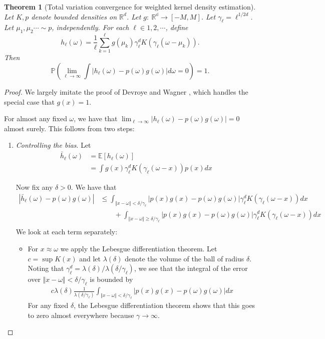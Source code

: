 \documentclass{article}
\newtheorem{theorem}{Theorem}
\theoremstyle{definition}
\begin{document}
\begin{theorem}[Total variation convergence for weighted kernel density estimation] \label{lem:kdereg}
Let $K,p$ denote bounded densities on $\mathbb{R}^d$.  Let $g:\ \mathbb{R^d} \rightarrow [-M,M]$.  Let $\gamma_\ell = \ell^{1/2d}$.  Let $\mu_1,\mu_2 \cdots \sim p$, independently.  For each $\ell \in 1,2,\cdots$, define  
\[
h_{\ell}(\omega) = \frac{1}{\ell} \sum_{k=1}^{\ell}g(\mu_k) \gamma_\ell^d K(\gamma_\ell(\omega - \mu_k)).
\]
Then
\[
\mathbb{P}\left(\lim_{\ell \rightarrow \infty} \int |h_{\ell}(\omega) - p(\omega)g(\omega)| d\omega  = 0\right) = 1.
\]
\end{theorem}
\begin{proof}

We largely imitate the proof of Devroye and Wagner \cite{devroye1979l1}, which handles the special case that $g(x)= 1$. 

For almost any fixed $\omega$, we have that $\lim_{\ell \rightarrow \infty}|h_\ell(\omega) - p(\omega) g(\omega)|=0$  almost surely.  This follows from two steps:

\begin{enumerate}
\item \emph{Controlling the bias}.  Let 
\begin{align*}
\bar h_{\ell}(\omega)
&= \mathbb{E}\left[h_{\ell}(\omega)\right]\\
&= \int g(x) \gamma_\ell^d K(\gamma_\ell(\omega - x)) p(x)dx
\end{align*}

Now fix any $\delta>0$.  We have that 
\begin{align*}
|\bar h_{\ell}(\omega) - p(\omega)g(\omega)| 
&\leq \int_{\Vert x-\omega \Vert < \delta/\gamma_\ell} |p(x)g(x) - p(\omega)g(\omega)| \gamma^d_\ell K(\gamma_\ell(\omega - x)) dx\\
&\qquad +  \int_{\Vert x-\omega \Vert \geq \delta/\gamma_\ell} |p(x)g(x) - p(\omega)g(\omega)| \gamma^d_\ell K(\gamma_\ell(\omega - x)) dx\\ 
\end{align*}
We look at each term separately:
\begin{itemize}
    \item For $x \approx \omega$ we apply the Lebesgue differentiation theorem.  Let $c=\sup K(x)$ and let $\lambda(\delta)$ denote the volume of the ball of radius $\delta$.  Noting that $\gamma^d_\ell = \lambda(\delta)/\lambda(\delta/\gamma_\ell)$, we see that the integral of the error over $\Vert x-\omega \Vert < \delta/\gamma_\ell$ is bounded by
    \begin{align*}
         c \lambda(\delta) \frac{1}{\lambda(\delta/\gamma_\ell)} \int_{\Vert x-\omega \Vert < \delta/\gamma_\ell} |p(x)g(x) - p(\omega)g(\omega)| dx
    \end{align*}
    For any fixed $\delta$, the Lebesgue differentiation theorem shows that this goes to zero almost everywhere because $\gamma \rightarrow \infty$.
    

\end{itemize}
\end{enumerate}
\end{proof}
\end{document}
